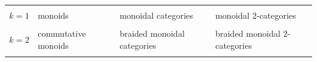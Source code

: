 \documentclass{article}
\begin{document}
\begin{longtable}[]{@{}llll@{}}
\begin{minipage}[t]{0.21\columnwidth}
\strut
\end{minipage}\tabularnewline
\begin{minipage}[t]{0.26\columnwidth}\raggedright
\(k=1\)\strut
\end{minipage} & \begin{minipage}[t]{0.21\columnwidth}\raggedright
monoids\strut
\end{minipage} & \begin{minipage}[t]{0.21\columnwidth}\raggedright
monoidal categories\strut
\end{minipage} & \begin{minipage}[t]{0.21\columnwidth}\raggedright
monoidal \(2\)-categories\strut
\end{minipage}\tabularnewline
\begin{minipage}[t]{0.26\columnwidth}\raggedright
\strut
\end{minipage} & \begin{minipage}[t]{0.21\columnwidth}\raggedright
\strut
\end{minipage} & \begin{minipage}[t]{0.21\columnwidth}\raggedright
\strut
\end{minipage} & \begin{minipage}[t]{0.21\columnwidth}\raggedright
\strut
\end{minipage}\tabularnewline
\begin{minipage}[t]{0.26\columnwidth}\raggedright
\(k=2\)\strut
\end{minipage} & \begin{minipage}[t]{0.21\columnwidth}\raggedright
commutative monoids\strut
\end{minipage} & \begin{minipage}[t]{0.21\columnwidth}\raggedright
braided monoidal categories\strut
\end{minipage} & \begin{minipage}[t]{0.21\columnwidth}\raggedright
braided monoidal \(2\)-categories\strut
\end{minipage}\tabularnewline
\begin{minipage}[t]{0.26\columnwidth}\raggedright
\strut
\end{minipage} & \begin{minipage}[t]{0.21\columnwidth}\raggedright
\strut
\end{minipage} & \begin{minipage}[t]{0.21\columnwidth}\raggedright
\strut
\end{minipage} & \begin{minipage}[t]{0.21\columnwidth}\raggedright

\end{minipage}
\end{longtable}
\end{document}
